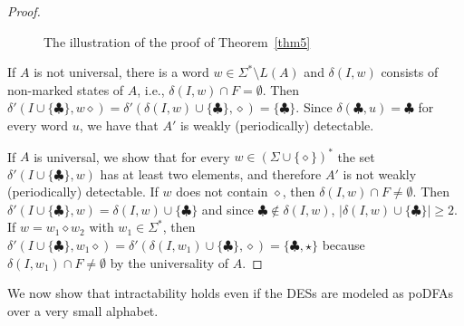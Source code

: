 \documentclass[twocolumn,amsthm]{autartx}
\begin{document}
\begin{proof}
\begin{figure}
      \caption{The illustration of the proof of Theorem~\ref{thm5}}
      \label{fig5}
    \end{figure}

    If $A$ is not universal, there is a word $w\in\Sigma^* \setminus L(A)$ and $\delta(I,w)$ consists of non-marked states of $A$, i.e., $\delta(I,w)\cap F=\emptyset$. Then $\delta'(I\cup\{\clubsuit\},w\diamond)=\delta'(\delta(I,w)\cup\{\clubsuit\},\diamond)=\{\clubsuit\}$. Since $\delta(\clubsuit,u)=\clubsuit$ for every word $u$, we have that $A'$ is weakly (periodically) detectable.
        
    If $A$ is universal, we show that for every $w\in (\Sigma\cup\{\diamond\})^*$ the set $\delta'(I\cup\{\clubsuit\},w)$ has at least two elements, and therefore $A'$ is not weakly (periodically) detectable. If $w$ does not contain $\diamond$, then $\delta(I,w) \cap F \neq \emptyset$. Then $\delta'(I \cup \{\clubsuit\}, w) = \delta(I,w) \cup \{\clubsuit\}$ and since $\clubsuit\notin \delta(I,w)$, $|\delta(I,w) \cup \{\clubsuit\}|\ge 2$. If $w=w_1\diamond w_2$ with $w_1\in\Sigma^*$, then $\delta'(I \cup \{\clubsuit\}, w_1\diamond) = \delta'(\delta(I,w_1) \cup \{\clubsuit\}, \diamond) = \{\clubsuit,\star\}$ because $\delta(I,w_1) \cap F\neq\emptyset$ by the universality of $A$.
  \end{proof}

  We now show that intractability holds even if the DESs are modeled as poDFAs over a very small alphabet.
\end{document}
